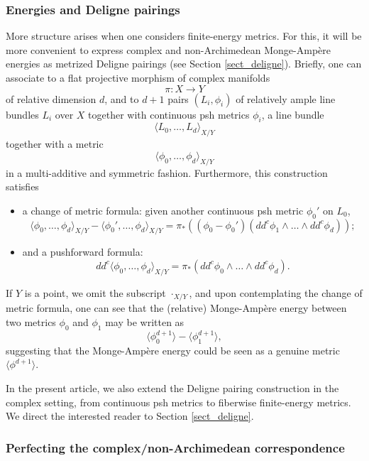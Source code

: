 \documentclass[JEP,XML,SOM,Unicode,NoEqCountersInSection,published]{cedram}
\theoremstyle{definition}
\begin{document}
\subsubsection*{Energies and Deligne pairings}

More structure arises when one considers finite-energy metrics. For this, it will be more convenient to express complex and non-Archimedean Monge-Ampère energies as metrized Deligne pairings (see Section \ref{sect_deligne}). Briefly, one can associate to a flat projective morphism of complex manifolds
\[
\pi:X\to Y
\]
of relative dimension $d$, and to $d+1$ pairs $(L_i,\phi_i)$ of relatively ample line bundles $L_i$ over $X$ together with continuous psh metrics $\phi_i$, a line bundle
\[
\langle L_0,\dots,L_d\rangle_{X/Y}
\]
together with a metric
\[
\langle \phi_0,\dots,\phi_d\rangle_{X/Y}
\]
in a multi-additive and symmetric fashion. Furthermore, this construction satisfies
\begin{itemize}
\item a change of metric formula: given another continuous psh metric $\phi_0'$ on $L_0$,
\begin{equation}
\langle \phi_0,\dots,\phi_d\rangle_{X/Y} - \langle \phi_0',\dots,\phi_d\rangle_{X/Y} = \pi_*\left((\phi_0-\phi_0')(dd^c\phi_1\wedge\dots\wedge dd^c\phi_d)\right);
\end{equation}
\item and a pushforward formula:
\begin{equation}
dd^c\langle \phi_0,\dots,\phi_d\rangle_{X/Y}=\pi_*(dd^c\phi_0\wedge\dots\wedge dd^c\phi_d).
\end{equation}
\end{itemize}
If $Y$ is a point, we omit the subscript $\cdot_{X/Y}$, and upon contemplating the change of metric formula, one can see that the (relative) Monge-Ampère energy between two metrics $\phi_0$ and $\phi_1$ may be written as
\[
\langle \phi_0^{d+1}\rangle - \langle \phi_1^{d+1}\rangle,
\]
suggesting that the Monge-Ampère energy could be seen as a genuine metric $\langle \phi^{d+1}\rangle$.

In the present article, we also extend the Deligne pairing construction in the complex setting, from continuous psh metrics to fiberwise finite-energy metrics. We direct the interested reader to Section \ref{sect_deligne}.

\subsubsection*{Perfecting the complex/non-Archimedean correspondence}
\end{document}
